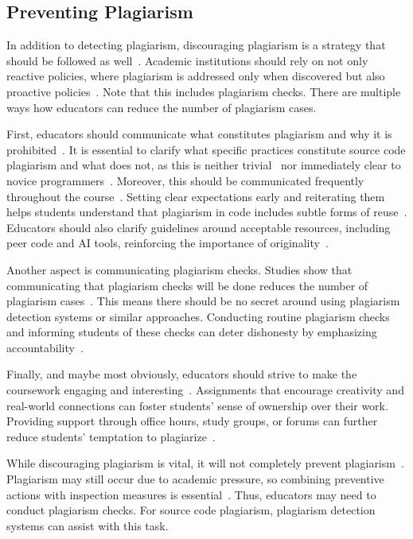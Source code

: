 \subsection{Preventing Plagiarism}

In addition to detecting plagiarism, discouraging plagiarism is a strategy that should be followed as well~\cite{Simon2016, Fincher2019}. Academic institutions should rely on not only reactive policies, where plagiarism is addressed only when discovered but also proactive policies~\cite{Culwin2001}. Note that this includes plagiarism checks.
There are multiple ways how educators can reduce the number of plagiarism cases.

First, educators should communicate what constitutes plagiarism and why it is prohibited~\cite{MirandaRodrguez2024}. It is essential to clarify what specific practices constitute source code plagiarism and what does not, as this is neither trivial~\cite{Simon2014b} nor immediately clear to novice programmers~\cite{Simon2014, Cosma2008}.
Moreover, this should be communicated frequently throughout the course~\cite{Simon2016}.
Setting clear expectations early and reiterating them helps students understand that plagiarism in code includes subtle forms of reuse~\cite{Fincher2019}.
Educators should also clarify guidelines around acceptable resources, including peer code and AI tools, reinforcing the importance of originality~\cite{ChatGPTGuide}.

Another aspect is communicating plagiarism checks. Studies show that communicating that plagiarism checks will be done reduces the number of plagiarism cases~\cite{BerrezuetaGuzman2023, Braumoeller2001}.
This means there should be no secret around using plagiarism detection systems or similar approaches.
Conducting routine plagiarism checks and informing students of these checks can deter dishonesty by emphasizing accountability~\cite{Fincher2019}.

Finally, and maybe most obviously, educators should strive to make the coursework engaging and interesting~\cite{Owens2013}. Assignments that encourage creativity and real-world connections can foster students' sense of ownership over their work. Providing support through office hours, study groups, or forums can further reduce students' temptation to plagiarize~\cite{Perkins2020}.

While discouraging plagiarism is vital, it will not completely prevent plagiarism~\cite{Fincher2019}.
Plagiarism may still occur due to academic pressure, so combining preventive actions with inspection measures is essential~\cite{Culwin2001, Simon2016}. Thus, educators may need to conduct plagiarism checks. For source code plagiarism, plagiarism detection systems can assist with this task.

